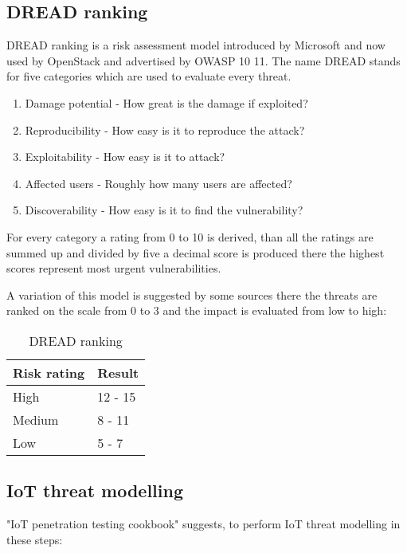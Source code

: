 \subsection{DREAD ranking}
DREAD ranking is a risk assessment model introduced by Microsoft and now used by OpenStack and advertised by OWASP {10} {11}. The name DREAD stands for five categories which are used to evaluate every threat.
\begin{enumerate}
	\item Damage potential - How great is the damage if exploited?
	\item Reproducibility - How easy is it to reproduce the attack?
	\item Exploitability - How easy is it to attack?
	\item Affected users - Roughly how many users are affected?
	\item Discoverability - How easy is it to find the vulnerability? \cite{cookbook}
\end{enumerate}
For every category a rating from 0 to 10 is derived, than all the ratings are summed up and divided by five a decimal score is produced there the highest scores represent most urgent vulnerabilities. 

A variation of this model is suggested by some sources\cite{dread}\cite{cookbook} there the threats are ranked on the scale from 0 to 3 and the impact is evaluated from low to high: 

\def\riska{High}
\def \probabilitya {12 - 15}

\def\riskaa{Medium}
\def \probabilityaa {8 - 11}

\def\riskaaa{Low}
\def \probabilityaaa {5 - 7}

\begin{table}
	\centering
	\begin{tabular}{ |m{2cm}|m{2cm}| } 
		\hline
		Risk rating & Result\\ 
		\hline
		\riska & \probabilitya \\ 
		\hline
		\riskaa & \probabilityaa \\ 
		\hline
		\riskaaa & \probabilityaaa \\ 
		\hline
	\end{tabular}
	\caption{\label{tab:dread_ranking} DREAD ranking}
\end{table}


\subsection{IoT threat modelling}
"IoT penetration testing cookbook"\cite{cookbook} suggests, to perform IoT threat modelling in these steps:

